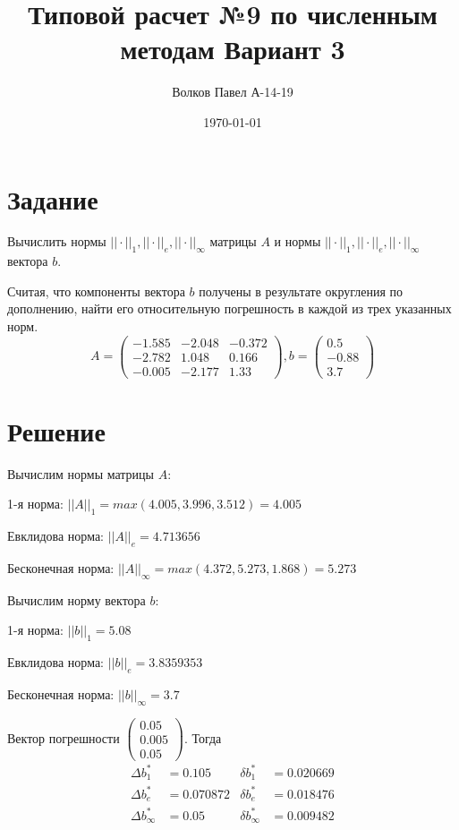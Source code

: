 \documentclass[a4paper,12pt]{report} %
\author{Волков Павел А-14-19}
\title{Типовой расчет №9 по численным методам Вариант 3}
\date{\today}
\begin{document}

\maketitle

\newpage
\section*{Задание}
Вычислить нормы $|| \cdot ||_1, || \cdot ||_e, || \cdot ||_{\infty}$ матрицы $A$ и нормы $|| \cdot ||_1, || \cdot ||_e, || \cdot ||_{\infty}$ вектора $b$.

Считая, что компоненты вектора $b$ получены в результате округления по дополнению, найти его относительную погрешность в каждой из трех указанных норм.
\[
	A = 
	\begin{pmatrix}
		-1.585 & -2.048 & -0.372 \\
		-2.782 & 1.048 & 0.166 \\
		-0.005 & -2.177 & 1.33 
	\end{pmatrix}, b = 
	\begin {pmatrix}
		0.5 \\ -0.88 \\ 3.7
	\end{pmatrix}
\]

\section*{Решение}
Вычислим нормы матрицы $A$:

1-я норма:  $||A||_1 = max(4.005, 3.996, 3.512) = 4.005$

Евклидова норма: $||A||_e = 4.713656$

Бесконечная норма: $||A||_{\infty} = max(4.372, 5.273, 1.868) = 5.273$

\hspace{2cm}

\noindent Вычислим норму вектора $b$:

1-я норма:  $||b||_1 = 5.08 $

Евклидова норма: $||b||_e = 3.8359353$

Бесконечная норма: $||b||_{\infty} = 3.7$

\hspace{2cm}

Вектор погрешности $\begin{pmatrix} 0.05 \\ 0.005 \\ 0.05 \end{pmatrix}$.
Тогда
\begin{align*}
	\Delta b^*_1 &= 0.105 & \delta b^*_1 &=0.020669\\
	\Delta b^*_e &= 0.070872 & \delta b^*_e &= 0.018476\\
	\Delta b^*_{\infty} &= 0.05 & \delta b^*_{\infty} &= 0.009482
\end{align*}
\end{document}
